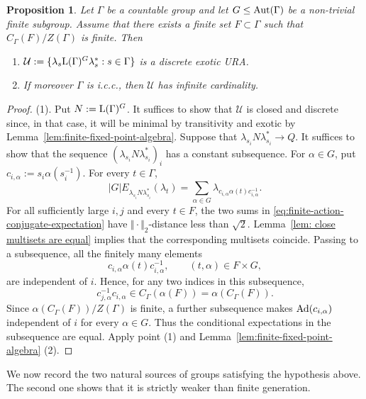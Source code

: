\documentclass[12pt]{amsart} %
\theoremstyle{plain}
\newtheorem{proposition}[theorem]{Proposition}
\theoremstyle{definition}
\newcommand{\LL}{{\rm L}}
\newcommand{\Aut}{{\rm Aut}}
\newcommand{\Ad}{{\rm Ad}}
\begin{document}
\begin{proposition}\label{prop:finite-action-fixed-point-rigidity}
Let $\Gamma$ be a countable group and let
$G\leq\Aut(\Gamma)$ be a non-trivial finite subgroup. Assume that
there exists a finite set $F\subset\Gamma$ such that
$C_\Gamma(F)/Z(\Gamma)$ is finite. Then
\begin{enumerate}
\item $\mathcal U:=\{\lambda_s\LL(\Gamma)^G\lambda_s^*:s\in\Gamma\}$ is a discrete exotic URA.
\item If moreover $\Gamma$ is i.c.c., then $\mathcal U$ has infinite
cardinality.
\end{enumerate}
\end{proposition}
\begin{proof}
{\rm(1)}. Put $N:=\LL(\Gamma)^G$. It suffices to show that $\mathcal U$ is closed
and discrete since, in that case, it will be minimal by transitivity and exotic by
Lemma~\ref{lem:finite-fixed-point-algebra}. Suppose that $\lambda_{s_i}N\lambda_{s_i}^*\to Q$. It suffices to show that the sequence $(\lambda_{s_i}N\lambda_{s_i}^*)_i$ has a constant subsequence. For
$\alpha\in G$, put $c_{i,\alpha}:=s_i\alpha(s_i^{-1})$. For every $t\in\Gamma$,
\begin{equation}\label{eq:finite-action-conjugate-expectation}
|G|E_{\lambda_{s_i}N\lambda_{s_i}^*}(\lambda_t)
=
\sum_{\alpha\in G}
\lambda_{c_{i,\alpha}\alpha(t)c_{i,\alpha}^{-1}}.
\end{equation}
For all sufficiently large $i,j$ and every $t\in F$, the two sums in
\eqref{eq:finite-action-conjugate-expectation} have $\Vert\cdot\Vert_2$-distance less than
$\sqrt2$.
Lemma~\ref{lem: close multisets are equal} implies that the corresponding
multisets coincide. Passing to a subsequence, all the finitely many elements
$$
c_{i,\alpha}\alpha(t)c_{i,\alpha}^{-1},
\qquad
(t,\alpha)\in F\times G,
$$
are independent of $i$. Hence, for any two indices in this subsequence,
$$
c_{j,\alpha}^{-1}c_{i,\alpha}
\in C_\Gamma(\alpha(F))
=
\alpha(C_\Gamma(F)).
$$
Since
$\alpha(C_\Gamma(F))/Z(\Gamma)$ is finite, a further subsequence makes
$\Ad(c_{i,\alpha})$ independent of $i$ for every $\alpha\in G$. Thus the
conditional expectations in the subsequence are equal.
\medskip
{} Apply point {\rm(1)} and
Lemma~\ref{lem:finite-fixed-point-algebra} {\rm(2)}.\end{proof}

\noindent We now record the two natural sources of groups satisfying the
hypothesis above. The second one shows that it is strictly weaker than finite
generation.
\medskip
\end{document}

